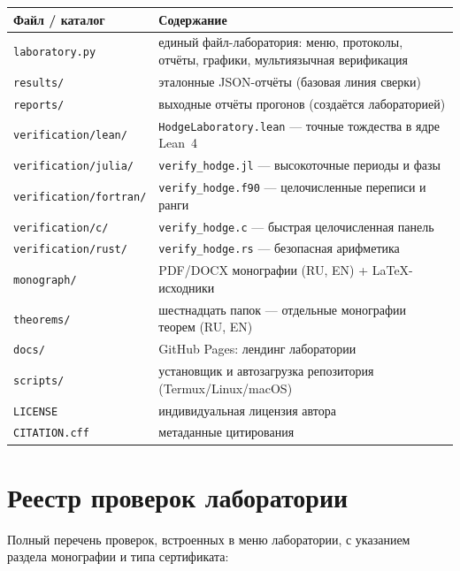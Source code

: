 \begin{center}
\small
\begin{tabularx}{\textwidth}{@{}l >{\raggedright\arraybackslash}X@{}}
\toprule
Файл / каталог & Содержание \\
\midrule
\texttt{laboratory.py} & единый файл-лаборатория: меню, протоколы,
отчёты, графики, мультиязычная верификация \\
\texttt{results/} & эталонные JSON-отчёты (базовая линия
сверки) \\
\texttt{reports/} & выходные отчёты прогонов (создаётся
лабораторией) \\
\texttt{verification/lean/} & \texttt{HodgeLaboratory.lean} ---
точные тождества в ядре Lean~4 \\
\texttt{verification/julia/} & \texttt{verify\_hodge.jl} ---
высокоточные периоды и фазы \\
\texttt{verification/fortran/} & \texttt{verify\_hodge.f90} ---
целочисленные переписи и ранги \\
\texttt{verification/c/} & \texttt{verify\_hodge.c} ---
быстрая целочисленная панель \\
\texttt{verification/rust/} & \texttt{verify\_hodge.rs} ---
безопасная арифметика \\
\texttt{monograph/} & PDF/DOCX монографии (RU, EN) + LaTeX-исходники \\
\texttt{theorems/} & шестнадцать папок --- отдельные монографии
теорем (RU, EN) \\
\texttt{docs/} & GitHub Pages: лендинг лаборатории \\
\texttt{scripts/} & установщик и автозагрузка репозитория
(Termux/Linux/macOS) \\
\texttt{LICENSE} & индивидуальная лицензия автора \\
\texttt{CITATION.cff} & метаданные цитирования \\
\bottomrule
\end{tabularx}
\end{center}

\section{Реестр проверок лаборатории}\label{app:labchecks}

Полный перечень проверок, встроенных в меню лаборатории, с
указанием раздела монографии и типа сертификата:

